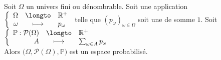\documentclass[11pt,a4paper,fleqn,pdftex]{report}
\begin{document}
\begin{theorem}
     Soit $\Omega$ un univers fini ou dénombrable. \newline
     Soit une application $\left\lbrace \begin{array}{r c l} \Omega &\longto& \mathbb{R}^+ \\ \omega &\longmapsto& p_\omega \end{array}\right.$ telle que $(p_\omega)_{\omega\in\Omega}$ soit une  de somme $1$.\newline
     Soit $\left\lbrace \begin{array}{r c l} \mathbb{P} : \mathcal{P}(\Omega)&\longto& \mathbb{R}^+ \\ A &\longmapsto& \sum_{\omega \in A} p_\omega \end{array}\right.$\\
     Alors $\big( \Omega, \mathcal{P}(\Omega ), \mathbb{P}\big)$ est un espace probabilisé.
\end{theorem}
\end{document}
